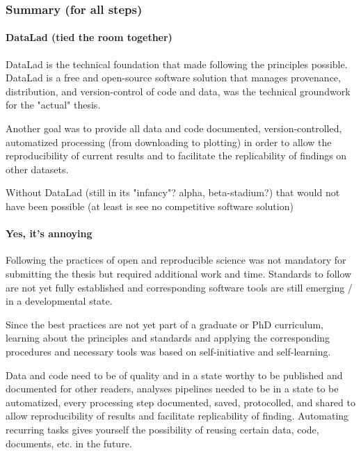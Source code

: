 \subsubsection{Summary (for all steps)}

\paragraph{DataLad (tied the room together)}
%
DataLad \citet{halchenko2021datalad} is the technical foundation that made
following the principles possible.
%
DataLad is a free and open-source software solution
that manages provenance, distribution, and version-control of code and data,
was the technical groundwork for the "actual" thesis.

%
Another goal was to provide all data and code documented, version-controlled,
automatized processing (from downloading to plotting) in order to allow the
reproducibility of current results and to facilitate the replicability of
findings on other datasets.

%
Without DataLad (still in its "infancy"? alpha, beta-stadium?) that would not
have been possible (at least is see no competitive software solution)


\paragraph{Yes, it's annoying}

%
Following the practices of open and reproducible science was not mandatory for
submitting the thesis but required additional work and time.
%
Standards to follow are not yet fully established and corresponding software
tools are still emerging / in a developmental state.

%
Since the best practices are not yet part of a graduate or PhD curriculum,
learning about the principles and standards and applying the corresponding
procedures and necessary tools was based on self-initiative and self-learning.

Data and code need to be of quality and in a state worthy to be published and
documented for other readers, analyses pipelines needed to be in a state to be
automatized, every processing step documented, saved, protocolled, and shared to
allow reproducibility of results and facilitate replicability of finding.
%
Automating recurring tasks gives yourself the possibility of reusing
certain data, code, documents, etc. in the future.



